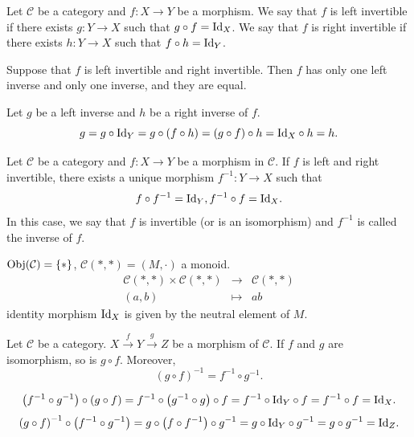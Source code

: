 \begin{definitionenv}
    Let $\mathcal{C}$ be a category and $f:X\rightarrow Y$ be a morphism. We say that $f$ is left invertible if there exists $g:Y\rightarrow X$ such that $g\circ f=\mathrm{Id}_X$. We say that $f$ is right invertible if there exists $h:Y\rightarrow X$ such that $f\circ h=\mathrm{Id}_Y$.
\end{definitionenv}
\begin{propositionenv}
    Suppose that $f$ is left invertible and right invertible. Then $f$ has only one left inverse and only one inverse, and they are equal.
\end{propositionenv}
\begin{proofenv}
    Let $g$ be a left inverse and $h$ be a right inverse of $f$.
    $$g = g\circ \mathrm{Id}_Y = g\circ \left(f\circ h\right)= \left(g\circ f\right)\circ h = \mathrm{Id}_X\circ h = h.$$
\end{proofenv}
\begin{definitionenv}
    Let $\mathcal{C}$ be a category and $f:X\rightarrow Y$ be a morphism in $\mathcal{C}$. If $f$ is left and right invertible, there exists a unique morphism $f^{-1}:Y\rightarrow X$ such that
    $$f\circ f^{-1}=\mathrm{Id}_{Y}, f^{-1}\circ f=\mathrm{Id}_{X}.$$
    In this case, we say that $f$ is invertible (or is an isomorphism) and $f^{-1}$ is called the inverse of $f$.
\end{definitionenv}
\begin{exampleenv}
    $\mathrm{Obj}(\mathcal{C})=\{*\}$, $\mathcal{C}(*,*)=(M,\cdot)$ a monoid.
    $$\begin{array}{rcl}
        \mathcal{C}(*,*)\times\mathcal{C}(*,*)&\rightarrow&\mathcal{C}(*,*)\\
        (a,b)&\mapsto& ab
    \end{array}$$
    identity morphism $\mathrm{Id}_X$ is given by the neutral element of $M$.
\end{exampleenv}
\begin{propositionenv}
    Let $\mathcal{C}$ be a category. $X\overset{f}{\rightarrow}Y\overset{g}{\rightarrow}Z$ be a morphism of $\mathcal{C}$. If $f$ and $g$ are isomorphism, so is $g\circ f$. Moreover,
    $$\left(g\circ f\right)^{-1} = f^{-1}\circ g^{-1}.$$
\end{propositionenv}
\begin{proofenv}
    $$\left(f^{-1}\circ g^{-1}\right) \circ\left(g\circ f\right) = f^{-1} \circ \left(g^{-1}\circ g\right)\circ f = f^{-1} \circ \mathrm{Id}_{Y} \circ f = f^{-1}\circ f = \mathrm{Id}_{X}.$$
    $$\left(g\circ f\right)^{-1} \circ \left(f^{-1}\circ g^{-1} \right) = g\circ\left(f\circ f^{-1}\right)\circ g^{-1} = g \circ \mathrm{Id}_{Y} \circ g^{-1} = g\circ g^{-1} =\mathrm{Id}_Z.$$
\end{proofenv}
